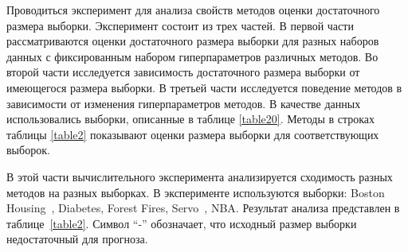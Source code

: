 Проводиться эксперимент для анализа свойств методов оценки достаточного размера выборки. Эксперимент состоит из трех частей.
В первой части рассматриваются оценки достаточного размера выборки для разных наборов данных с фиксированным набором гиперпараметров различных методов.
Во второй части исследуется зависимость достаточного размера выборки от имеющегося размера выборки. В третьей части исследуется поведение методов в зависимости от изменения гиперпараметров методов. В качестве данных использовались выборки, описанные в таблице \ref{table20}. Методы в строках таблицы \ref{table2} показывают оценки размера выборки для соответствующих выборок.
 
\begin{table}[!hbp]
\centering
\caption{Эксперимент по оценке размера выборки для различных наборов выборок}
\label{table2}
\end{table}

В этой части вычислительного эксперимента анализируется сходимость разных методов на разных выборках. В эксперименте используются выборки: Boston Housing~\cite{Boston}, Diabetes, Forest Fires, Servo~\cite{servo}, NBA.
Результат анализа представлен в таблице~\ref{table2}. Символ ``-'' обозначает, что исходный размер выборки недостаточный для прогноза.

